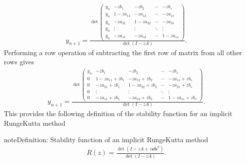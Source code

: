 \documentclass[letterpaper,10pt,english]{jupyterBook}
\begin{document}
\begin{align*}
    y_{n+1} = \frac{\det 
    \begin{pmatrix}
        y_n  & -zb_1  & -zb_2  & \cdots  & -zb_s \\
        y_n  & 1-za_{11}  & -za_{12}  & \cdots  & -za_{1s} \\
        y_n  & -za_{21}  & 1-za_{22}  & \cdots  & -za_{2s} \\
        y_n  & \vdots  & \vdots  & \ddots  & \vdots \\
        y_n  & -za_{s1}  & -za_{s2}  & \cdots  & 1-za_{ss} 
    \end{pmatrix}}{\det (I-zA)}.
\end{align*}
\sphinxAtStartPar
Performing a row operation of subtracting the first row of matrix from all other rows gives
\begin{align*}
    y_{n+1} =\frac{\det 
    \begin{pmatrix}
        y_n  & -zb_1  & -zb_2  & \cdots  & -zb_s \\
        0 & 1-za_{11} +zb_1  & -za_{12} +zb_2  & \cdots  & -za_{1s} +zb_s \\
        0 & -za_{21} +zb_1  & 1-za_{22} +zb_2  & \cdots  & -za_{2s} +zb_s \\
        0 & \vdots  & \vdots  & \ddots  & \vdots \\
        0 & -za_{s1} +zb_1  & -za_{s2} +zb_2  & \cdots  & 1-za_{ss} +zb_s 
    \end{pmatrix}}{\det(I-zA)}.
\end{align*}
\sphinxAtStartPar
This provides the following definition of the stability function for an implicit Runge\sphinxhyphen{}Kutta method

\begin{sphinxadmonition}{note}{Definition: Stability function of an implicit Runge\sphinxhyphen{}Kutta method}
\begin{equation}\label{equation:4_Stability/4.3_IRK_stability_function:irk-stability-rz-equation}
\begin{split}R(z) = \frac{\det (I - zA + z\mathbf{e}\mathbf{b}^T)}{\det(I - zA)}.\end{split}
\end{equation}\end{sphinxadmonition}
\end{document}
